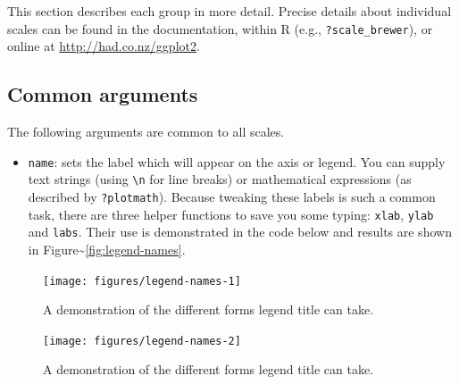 \noindent  This section describes each group in more detail. Precise
details about individual scales can be found in the documentation,
within R (e.g., \texttt{?scale\_brewer}), or online at
\url{http://had.co.nz/ggplot2}.

\subsection{Common arguments}\label{sub:scale-arguments}

The following arguments are common to all scales.

\begin{itemize}
\itemsep1pt\parskip0pt
\item
  \texttt{name}: sets the label which will appear on the axis or legend.
  You can supply text strings (using \texttt{\textbackslash{}n} for line
  breaks) or mathematical expressions (as described by
  \texttt{?plotmath}). Because tweaking these labels is such a common
  task, there are three helper functions to save you some typing:
  \texttt{xlab}, \texttt{ylab} and \texttt{labs}. Their use is
  demonstrated in the code below and results are shown in
  Figure\textasciitilde{}\ref{fig:legend-names}. 
   
\end{itemize}

\begin{Shaded}
\begin{Highlighting}[]
\StringTok{ }  
\end{Highlighting}
\end{Shaded}

\begin{figure}
\texttt{[image: figures/legend-names-1]} \caption{A demonstration of the different forms legend title can take.\label{fig:legend-names1}}
\end{figure}

\begin{Shaded}
\begin{Highlighting}[]
\StringTok{ }\NormalTok{(}\NormalTok{)}
\end{Highlighting}
\end{Shaded}

\begin{figure}
\texttt{[image: figures/legend-names-2]} \caption{A demonstration of the different forms legend title can take.\label{fig:legend-names2}}
\end{figure}

